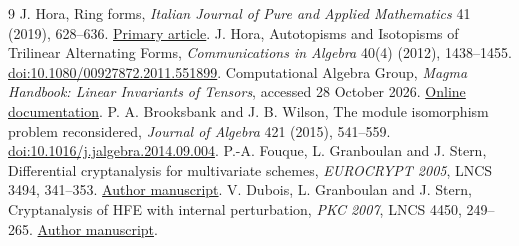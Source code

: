 \documentclass[11pt]{article}
\begin{document}
\begin{thebibliography}{9}
 J. Hora, Ring forms, \emph{Italian Journal of Pure and Applied
Mathematics} 41 (2019), 628--636.
\href{https://ijpam.uniud.it/online_issue/201941/55-Jan\%20Hora.pdf}{Primary article}.
 J. Hora, Autotopisms and Isotopisms of Trilinear Alternating
Forms, \emph{Communications in Algebra} 40(4) (2012), 1438--1455.
\href{https://doi.org/10.1080/00927872.2011.551899}{doi:10.1080/00927872.2011.551899}.
 Computational Algebra Group, \emph{Magma Handbook:
Linear Invariants of Tensors}, accessed 28 October 2026.
\href{https://docs.magma-maths.org/Modules/MultilinearAlgebra/Linear-invariants-of-tensors.html}{Online documentation}.
 P. A. Brooksbank and J. B. Wilson, The module isomorphism
problem reconsidered, \emph{Journal of Algebra} 421 (2015), 541--559.
\href{https://doi.org/10.1016/j.jalgebra.2014.09.004}{doi:10.1016/j.jalgebra.2014.09.004}.
 P.-A. Fouque, L. Granboulan and J. Stern, Differential
cryptanalysis for multivariate schemes, \emph{EUROCRYPT 2005}, LNCS 3494,
341--353. \href{https://www.di.ens.fr/~fouque/pub/eurocrypt05.pdf}{Author manuscript}.
 V. Dubois, L. Granboulan and J. Stern, Cryptanalysis of HFE
with internal perturbation, \emph{PKC 2007}, LNCS 4450, 249--265.
\href{https://www.di.ens.fr/~stern/data/St118.pdf}{Author manuscript}.
\end{thebibliography}
\end{document}
